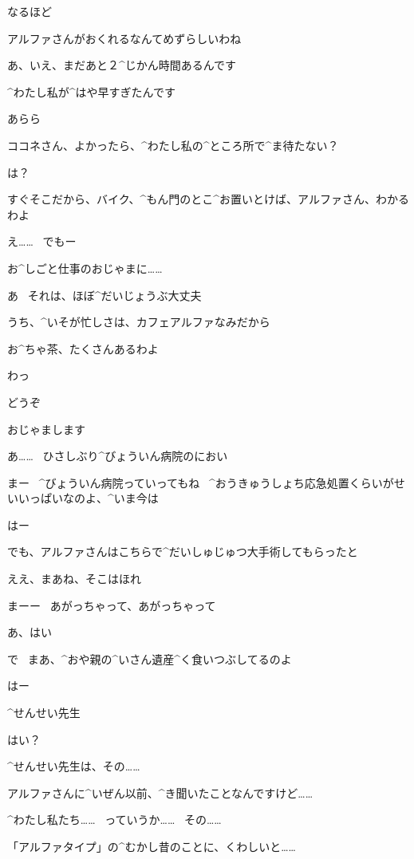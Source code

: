 \Sensei なるほど

\Sensei アルファさんがおくれるなんてめずらしいわね

\Kokone あ、いえ、まだあと２^{じかん}{時間}あるんです

\Kokone ^{わたし}{私}が^{はや}{早}すぎたんです

\Sensei あらら

\page
\Sensei ココネさん、よかったら、^{わたし}{私}の^{ところ}{所}で^{ま}{待}たない？

\Kokone は？

\Sensei すぐそこだから、バイク、^{もん}{門}のとこ^{お}{置}いとけば、アルファさん、わかるわよ

\Kokone え……
\ でもー

\Kokone お^{しごと}{仕事}のおじゃまに……

\Sensei あ
\ それは、ほぼ^{だいじょうぶ}{大丈夫}

\page
\Sensei うち、^{いそが}{忙}しさは、カフェアルファなみだから

\Sensei お^{ちゃ}{茶}、たくさんあるわよ

\Kokone わっ

\page
\Sensei どうぞ

\Kokone おじゃまします

\Kokone あ……
\ ひさしぶり^{びょういん}{病院}のにおい

\Sensei まー
\ ^{びょういん}{病院}っていってもね
\ ^{おうきゅうしょち}{応急処置}くらいがせいいっぱいなのよ、^{いま}{今}は

\Kokone はー

\Kokone でも、アルファさんはこちらで^{だいしゅじゅつ}{大手術}してもらったと

\Sensei ええ、まあね、そこはほれ

\Sensei まーー
\ あがっちゃって、あがっちゃって

\Kokone あ、はい

\page
\Sensei で
\ まあ、^{おや}{親}の^{いさん}{遺産}^{く}{食}いつぶしてるのよ

\Kokone はー

\Kokone ^{せんせい}{先生}

\Sensei はい？

\Kokone ^{せんせい}{先生}は、その……

\Kokone アルファさんに^{いぜん}{以前}、^{き}{聞}いたことなんですけど……

\page
\Kokone ^{わたし}{私}たち……
\ っていうか……
\ その……

\Kokone 「アルファタイプ」の^{むかし}{昔}のことに、くわしいと……


